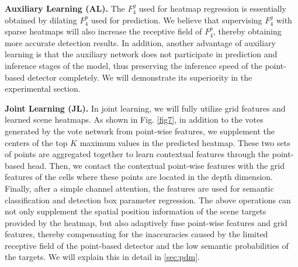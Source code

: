 \textbf{Auxiliary Learning (AL).} The $F^g_4$ used for heatmap regression is essentially obtained by dilating $F^p_4$ used for prediction. We believe that supervising $F^g_4$ with sparse heatmaps will also increase the receptive field of $F^p_4$, thereby obtaining more accurate detection results. In addition, another advantage of auxiliary learning is that the auxiliary network does not participate in prediction and inference stages of the model, thus preserving the inference speed of the point-based detector completely. We will demonstrate its superiority in the experimental section.

\textbf{Joint Learning (JL).} In joint learning, we will fully utilize grid features and learned scene heatmaps. As shown in Fig. \ref{fig7}, in addition to the votes generated by the vote network from point-wise features, we supplement the centers of the top $K$ maximum values in the predicted heatmap. These two sets of points are aggregated together to learn contextual features through the point-based head. Then, we contact the contextual point-wise features with the grid features of the cells where these points are located in the depth dimension. Finally, after a simple channel attention, the features are used for semantic classification and detection box parameter regression. The above operations can not only supplement the spatial position information of the scene targets provided by the heatmap, but also adaptively fuse point-wise features and grid features, thereby compensating for the inaccuracies caused by the limited receptive field of the point-based detector and the low semantic probabilities of the targets. We will explain this in detail in \ref{sec:pdm}.